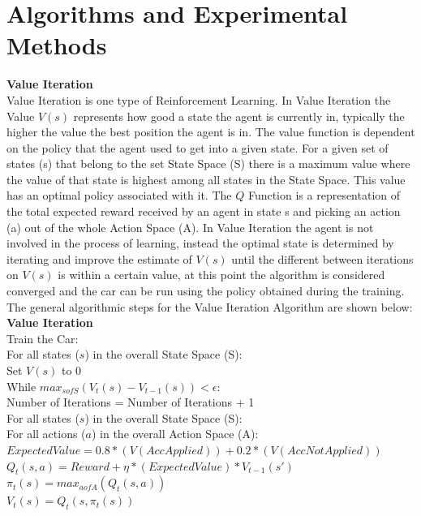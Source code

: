 \documentclass[twoside,11pt]{article}
\newcommand\tab[1][1cm]{\hspace*{#1}}
\begin{document}
\section{Algorithms and Experimental Methods}
\textbf{Value Iteration}\\
\hspace*{10mm} Value Iteration is one type of Reinforcement Learning. In Value Iteration the Value $V(s)$ represents how good a state the agent is currently in, typically the higher the value the best position the agent is in. The value function is dependent on the policy that the agent used to get into a given state. For a given set of states (s) that belong to the set State Space (S) there is a maximum value where the value of that state is highest among all states in the State Space. This value has an optimal policy associated with it. The $Q$ Function is a representation of the total expected reward received by an agent in state s and picking an action (a) out of the whole Action Space (A). In Value Iteration the agent is not involved in the process of learning, instead the optimal state is determined by iterating and improve the estimate of $V(s)$ until the different between iterations on $V(s)$ is within a certain value, at this point the algorithm is considered converged and the car can be run using the policy obtained during the training. The general algorithmic steps for the Value Iteration Algorithm are shown below:\\
\textbf{Value Iteration}\\
Train the Car:\\
\tab For all states ($s$) in the overall State Space (S):\\
\tab \tab Set $V(s)$ to $0$\\
\tab While  $max_{s of S}(V_t(s) - V_{t-1}(s)) < \epsilon$:\\
\tab \tab Number of Iterations = Number of Iterations + 1\\
\tab \tab For all states ($s$) in the overall State Space (S):\\
\tab \tab \tab For all actions ($a$) in the overall Action Space (A):\\
\tab \tab \tab \tab $Expected Value = 0.8 * (V(Acc Applied)) + 0.2 * (V(Acc Not Applied))$\\
\tab \tab \tab \tab $Q_t(s,a) = Reward + \eta*(Expected Value) * V_{t-1}(s')$\\
\tab \tab \tab $\pi_t(s) = max_{a of A}(Q_t(s,a))$\\
\tab \tab \tab $V_t(s) = Q_t(s,\pi_t(s))$\\
\end{document}
